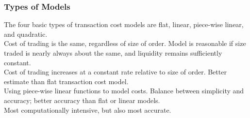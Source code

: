 \subsubsection{Types of Models}

The four basic types of transaction cost models are flat, linear, piece-wise linear, and quadratic.\\

 Cost of trading is the same, regardless of size of order. Model is reasonable if size traded is nearly always about the same, and liquidity remains sufficiently constant.\\

 Cost of trading increases at a constant rate relative to size of order. Better estimate than flat transaction cost model.\\

 Using piece-wise linear functions to model costs. Balance between simplicity and accuracy; better accuracy than flat or linear models.\\

 Most computationally intensive, but also most accurate.